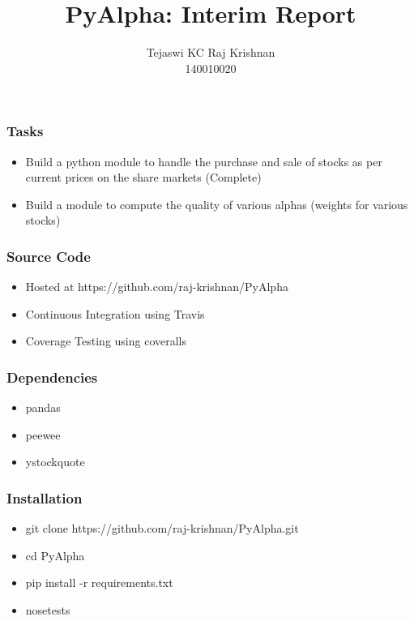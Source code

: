 \documentclass[serif,mathserif]{beamer}
\author[Tejaswi KC, Raj Krishnan]{Tejaswi KC \quad Raj Krishnan \\ 140010020 \quad 140010007}
\title[PyAlpha\hspace{2em}\insertframenumber/\inserttotalframenumber]{PyAlpha: Interim Report}
\institute{Indian Institute of Technology, Bombay}
\begin{document}
  \maketitle

  \begin{frame}
    \frametitle{Tasks}
    \begin{itemize}
      \item Build a python module to handle the purchase and sale of stocks
       as per current prices on the share markets (Complete)
      \item Build a module to compute the quality of various alphas (weights
       for various stocks)
    \end{itemize}
  \end{frame}

  \begin{frame}
    \frametitle{Source Code}
    \begin{itemize}
      \item Hosted at https://github.com/raj-krishnan/PyAlpha
      \item Continuous Integration using Travis
      \item Coverage Testing using coveralls
      \end{itemize}
  \end{frame}

  \begin{frame}
    \frametitle{Dependencies}
    \begin{itemize}
      \item pandas
      \item peewee
      \item ystockquote
    \end{itemize}
  \end{frame}

  \begin{frame}
    \frametitle{Installation}
    \begin{itemize}
      \item git clone https://github.com/raj-krishnan/PyAlpha.git
      \item cd PyAlpha
      \item pip install -r requirements.txt
      \item nosetests
    \end{itemize}
  \end{frame}
  
\end{document}
